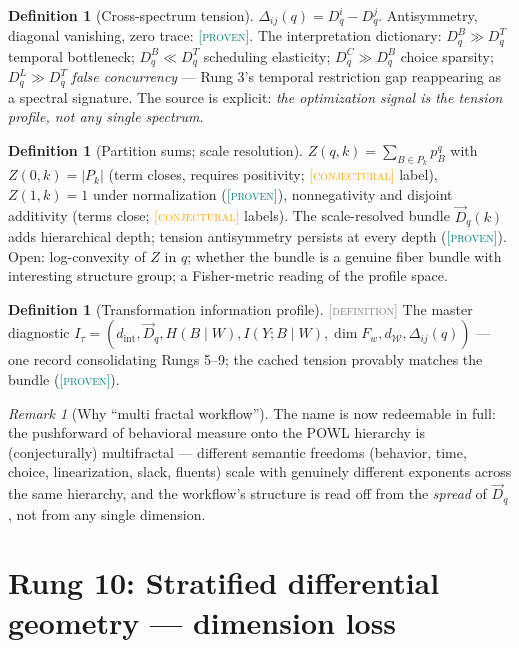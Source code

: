 \documentclass[11pt]{article}
\newcommand{\PROVEN}{\textcolor{teal}{\textsc{[proven]}}}
\newcommand{\DEFINITION}{\textcolor{gray}{\textsc{[definition]}}}
\newcommand{\CONJECTURAL}{\textcolor{orange}{\textsc{[conjectural]}}}
\newcommand{\fib}[1]{F_{#1}}
\newcommand{\dW}{d_{\mathcal{W}}}
\theoremstyle{plain}
\theoremstyle{definition}
\newtheorem{definition}[theorem]{Definition}
\theoremstyle{remark}
\newtheorem{remark}[theorem]{Remark}
\begin{document}
\begin{definition}[Cross-spectrum tension]\;
$\Delta_{ij}(q) = D_q^i - D_q^j$. Antisymmetry, diagonal vanishing, zero
trace: \PROVEN. The interpretation dictionary: $D_q^B \gg D_q^T$ temporal
bottleneck; $D_q^B \ll D_q^T$ scheduling elasticity; $D_q^C \gg D_q^B$
choice sparsity; $D_q^L \gg D_q^T$ \emph{false concurrency} --- Rung 3's
temporal restriction gap reappearing as a spectral signature. The source is
explicit: \emph{the optimization signal is the tension profile, not any
single spectrum}.
\end{definition}

\begin{definition}[Partition sums; scale resolution]\;
$Z(q,k) = \sum_{B \in P_k} p_B^q$ with $Z(0,k) = |P_k|$ (term closes,
requires positivity; \CONJECTURAL{} label), $Z(1,k) = 1$ under
normalization (\PROVEN), nonnegativity and disjoint additivity (terms
close; \CONJECTURAL{} labels). The scale-resolved bundle $\vec{D}_q(k)$
adds hierarchical depth; tension antisymmetry persists at every depth
(\PROVEN). Open: log-convexity of $Z$ in $q$; whether the bundle is a
genuine fiber bundle with interesting structure group; a Fisher-metric
reading of the profile space.
\end{definition}

\begin{definition}[Transformation information profile]\DEFINITION\;
The master diagnostic
$I_\tau = (d_{\mathrm{int}}, \vec{D}_q, H(B\mid W), I(Y;B\mid W),
\dim \fib{w}, \dW, \Delta_{ij}(q))$ --- one record consolidating Rungs
5--9; the cached tension provably matches the bundle (\PROVEN).
\end{definition}

\begin{remark}[Why ``multi fractal workflow'']
The name is now redeemable in full: the pushforward of behavioral measure
onto the POWL hierarchy is (conjecturally) multifractal --- different
semantic freedoms (behavior, time, choice, linearization, slack, fluents)
scale with genuinely different exponents across the same hierarchy, and
the workflow's structure is read off from the \emph{spread} of
$\vec{D}_q$, not from any single dimension.
\end{remark}

\section{Rung 10: Stratified differential geometry --- dimension loss}
\label{sec:rung10}
\end{document}
